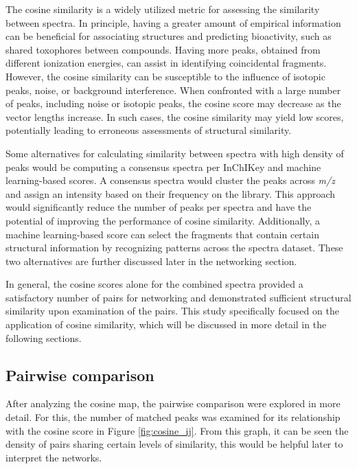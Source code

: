 The cosine similarity is a widely utilized metric for assessing the similarity between spectra. In principle, having a greater amount of empirical information can be beneficial for associating structures and predicting bioactivity, such as shared toxophores between compounds. Having more peaks, obtained from different ionization energies, can assist in identifying coincidental fragments. However, the cosine similarity can be susceptible to the influence of isotopic peaks, noise, or background interference. When confronted with a large number of peaks, including noise or isotopic peaks, the cosine score may decrease as the vector lengths increase. In such cases, the cosine similarity may yield low scores, potentially leading to erroneous assessments of structural similarity.

Some alternatives for calculating similarity between spectra with high density of peaks would be computing a consensus spectra per InChIKey and machine learning-based scores. A consensus spectra would cluster the peaks across \textit{m/z} and assign an intensity based on their frequency on the library. This approach would significantly reduce the number of peaks per spectra and have the potential of improving the performance of cosine similarity. Additionally, a machine learning-based score can select the fragments that contain certain structural information by recognizing patterns across the spectra dataset. These two alternatives are further discussed later in the networking section. 

In general, the cosine scores alone for the combined spectra provided a satisfactory number of pairs for networking and demonstrated sufficient structural similarity upon examination of the pairs. This study specifically focused on the application of cosine similarity, which will be discussed in more detail in the following sections.

\subsection*{Pairwise comparison}

After analyzing the cosine map, the pairwise comparison were explored in more detail. For this, the number of matched peaks was examined for its relationship with the cosine score in Figure \ref{fig:cosine_ij}. From this graph, it can be seen the density of pairs sharing certain levels of similarity, this would be helpful later to interpret the networks.

